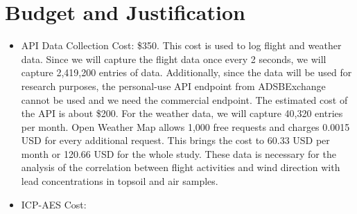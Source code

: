\documentclass[12pt]{article}
\begin{document}
\section{Budget and Justification}
\begin{itemize}
    \item API Data Collection Cost: \$350. This cost is used to log flight and weather data. Since we will capture the flight data once every 2 seconds, we will capture 2,419,200 entries of data. Additionally, since the data will be used for research purposes, the personal-use API endpoint from ADSBExchange cannot be used and we need the commercial endpoint. The estimated cost of the API is about \$200. For the weather data, we will capture 40,320 entries per month. Open Weather Map allows 1,000 free requests and charges 0.0015 USD for every additional request. This brings the cost to 60.33 USD per month or 120.66 USD for the whole study. These data is necessary for the analysis of the correlation between flight activities and wind direction with lead concentrations in topsoil and air samples. 
    \item ICP-AES Cost: 
\end{itemize}

\newpage
\printbibliography
\end{document}

